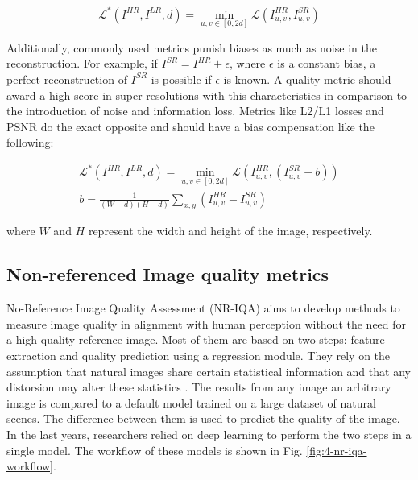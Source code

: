             \begin{equation}
               \mathcal{L}^* ( I^{HR}, I^{LR}, d) = \min_{u,v \in [0,2d]} \mathcal{L} ( I^{HR}_{u,v}, I^{SR}_{u,v})
            \label{eq:4_adjusted_metrics}
            \end{equation}
    
            Additionally, commonly used metrics punish biases as much as noise in the reconstruction.
            For example, if $I^{SR} = I^{HR} + \epsilon$, where $\epsilon$ is a constant bias, a perfect reconstruction of $I^{SR}$ is possible if $\epsilon$ is known. 
            A quality metric should award a high score in super-resolutions with this characteristics in comparison to the introduction of noise and information loss. Metrics like L2/L1 losses and PSNR do the exact opposite and should have a bias compensation like the following: 
    
            \begin{equation}
                \begin{aligned}
                    \mathcal{L}^* ( I^{HR}, I^{LR}, d) = \min_{u,v \in [0,2d]} \mathcal{L} ( I^{HR}_{u,v}, (I^{SR}_{u,v}+b)) \\
                    b = \frac{1}{(W - d)(H - d)} \sum_{x,y} \left( I^{HR}_{u,v} - I^{SR}_{u,v} \right)
               \end{aligned}
            \end{equation}
    
            \noindent where $W$ and $H$ represent the width and height of the image, respectively.
    

    \subsection{Non-referenced Image quality metrics}

    No-Reference Image Quality Assessment (NR-IQA) aims to develop methods to measure image quality in alignment with human perception without the need for a high-quality reference image. 
    Most of them are based on two steps: feature extraction and quality prediction using a regression module. 
    They rely on the assumption that natural images share certain statistical information and that any distorsion may alter these statistics \cite{niqe}.
    The results from any image an arbitrary image is compared to a default model trained on a large dataset of natural scenes. 
    The difference  between them is used to predict the quality of the image.
    In the last years, researchers relied on deep learning to perform the two steps in a single model. 
    The workflow of these models is shown in Fig. \ref{fig:4-nr-iqa-workflow}.

